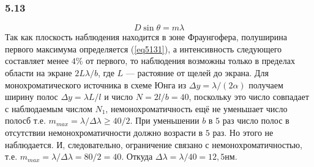 \subsubsection*{5.13}
\begin{equation}\label{eq5131}
	D \sin \theta = m \lambda
\end{equation}
Так как плоскость наблюдения находится в зоне Фраунгофера, полуширина первого максимума определяется (\ref{eq5131}), а интенсивность следующего составляет менее $4\%$ от первого, то наблюдения возможны только в пределах области на экране $2L\lambda/b$, где $L$ --- растояние от щелей до экрана. Для монохроматического источника в схеме Юнга из $\Delta y = \lambda / (2\alpha)$ получаем ширину полос $\Delta y = \lambda L / l$ и число $N = 2l /b = 40$, поскольку это число совпадает с наблюдаемым числом $N_1$, немонохроматичность ещё не уменьшает число полосб т.е. $m_{max} = \lambda / \Delta \lambda \geq 40/2$. При уменьшении $b$ в $5$ раз число полос в отсутствии немонохроматичности должно возрасти в $5$ раз. Но этого не наблюдается. И, следовательно, ограничение связано с немонохроматичностью, т.е. $m_{max} = \lambda / \Delta \lambda = 80/2 = 40$. Откуда $\Delta \lambda = \lambda / 40 = 12,5 нм$.